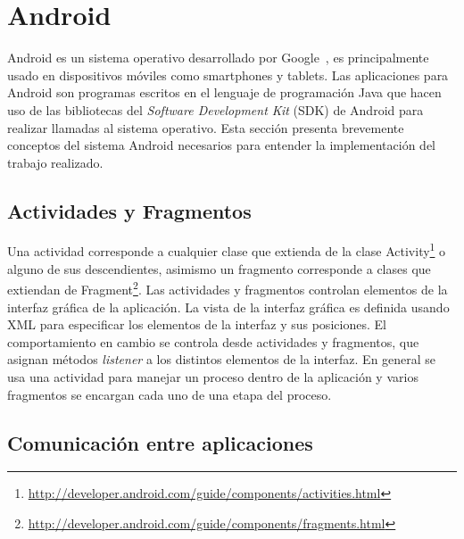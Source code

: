 \section{Android}\label{android}
Android es un sistema operativo desarrollado por Google~\cite{android}, es principalmente usado en dispositivos móviles como smartphones y tablets. Las aplicaciones para Android son programas escritos en el lenguaje de programación Java que hacen uso de las bibliotecas del \emph{Software Development Kit} (SDK) de Android para realizar llamadas al sistema operativo. Esta sección presenta brevemente conceptos del sistema Android necesarios para entender la implementación del trabajo realizado.

\subsection*{Actividades y Fragmentos}

Una actividad corresponde a cualquier clase que extienda de la clase Activity\footnote{\url{http://developer.android.com/guide/components/activities.html}} o alguno de sus descendientes, asimismo un fragmento corresponde a clases que extiendan de Fragment\footnote{\url{http://developer.android.com/guide/components/fragments.html}}. Las actividades y fragmentos controlan elementos de la interfaz gráfica de la aplicación. La vista de la interfaz gráfica es definida usando XML para especificar los elementos de la interfaz y sus posiciones. El comportamiento en cambio se controla desde actividades y fragmentos, que asignan métodos \emph{listener} a los distintos elementos de la interfaz. 
En general se usa una actividad para manejar un proceso dentro de la aplicación y varios fragmentos se encargan cada uno de una etapa del proceso.

\subsection*{Comunicación entre aplicaciones}

